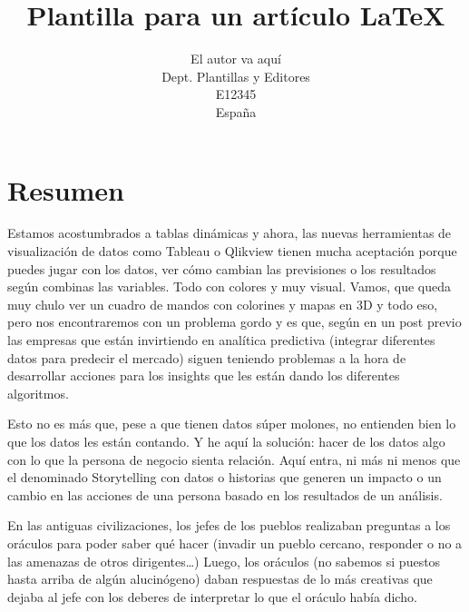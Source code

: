 %
%



\title{Plantilla para un artículo \LaTeX}
\author{El autor va aquí\\
  \small Dept. Plantillas y Editores\\
  \small E12345\\
  \small España
}


\section{Resumen}
\item{Estamos acostumbrados a tablas dinámicas y  ahora, las nuevas herramientas de visualización de datos como Tableau o Qlikview tienen mucha aceptación porque puedes jugar con los datos, ver cómo cambian las previsiones o los resultados según combinas las variables. Todo con colores y muy visual. Vamos, que queda muy chulo ver un cuadro de mandos con colorines y mapas en 3D y todo eso, pero nos encontraremos con un problema gordo y es que, según en un post previo las empresas que están invirtiendo en analítica predictiva (integrar diferentes datos para predecir el mercado) siguen teniendo problemas a la hora de desarrollar acciones para los insights que les están dando los diferentes algoritmos.

Esto no es más que, pese a que tienen datos súper molones, no entienden bien lo que los datos les están contando. Y he aquí la solución: hacer de los datos algo con lo que la persona de negocio sienta relación. Aquí entra, ni más ni menos que el denominado Storytelling con datos  o historias que generen un impacto o un cambio en las acciones de una persona basado en los resultados de un análisis.

En las antiguas civilizaciones, los jefes de los pueblos realizaban preguntas a los oráculos para poder saber qué hacer (invadir un pueblo cercano, responder o no a las amenazas de otros dirigentes…) Luego, los oráculos (no sabemos si puestos hasta arriba de algún alucinógeno) daban respuestas de lo más creativas que dejaba al jefe con los deberes de interpretar lo que el oráculo había dicho.

}
